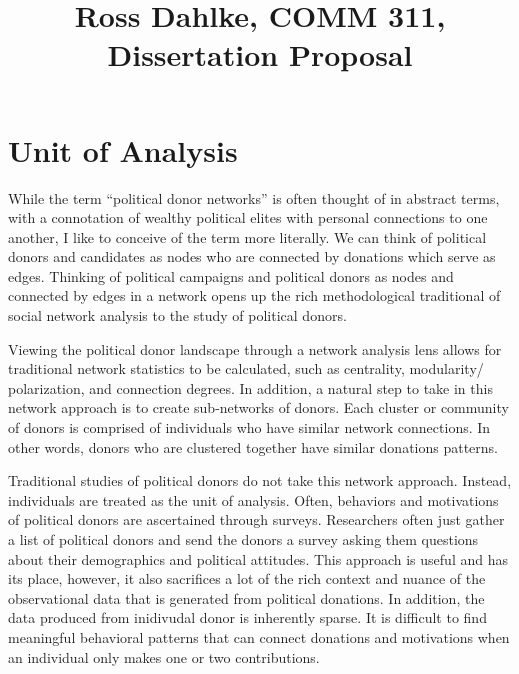 \documentclass[12pt,]{article}
\title{Ross Dahlke, COMM 311, Dissertation Proposal  }
\author{}
\date{}
\begin{document}
	
%

{%
\setlength{\parindent}{0pt}
\thispagestyle{plain}
{\fontsize{18}{20}\selectfont\raggedright 
\maketitle  %

}

{
   \vskip 13.5pt\relax \normalsize\fontsize{11}{12} 
 

}

}






\vskip -8.5pt



\noindent \doublespacing 

\hypertarget{unit-of-analysis}{%
\section{Unit of Analysis}\label{unit-of-analysis}}

While the term ``political donor networks'' is often thought of in
abstract terms, with a connotation of wealthy political elites with
personal connections to one another, I like to conceive of the term more
literally. We can think of political donors and candidates as nodes who
are connected by donations which serve as edges. Thinking of political
campaigns and political donors as nodes and connected by edges in a
network opens up the rich methodological traditional of social network
analysis to the study of political donors.

Viewing the political donor landscape through a network analysis lens
allows for traditional network statistics to be calculated, such as
centrality, modularity/ polarization, and connection degrees. In
addition, a natural step to take in this network approach is to create
sub-networks of donors. Each cluster or community of donors is comprised
of individuals who have similar network connections. In other words,
donors who are clustered together have similar donations patterns.

Traditional studies of political donors do not take this network
approach. Instead, individuals are treated as the unit of analysis.
Often, behaviors and motivations of political donors are ascertained
through surveys. Researchers often just gather a list of political
donors and send the donors a survey asking them questions about their
demographics and political attitudes. This approach is useful and has
its place, however, it also sacrifices a lot of the rich context and
nuance of the observational data that is generated from political
donations. In addition, the data produced from inidivudal donor is
inherently sparse. It is difficult to find meaningful behavioral
patterns that can connect donations and motivations when an individual
only makes one or two contributions.
\end{document}
